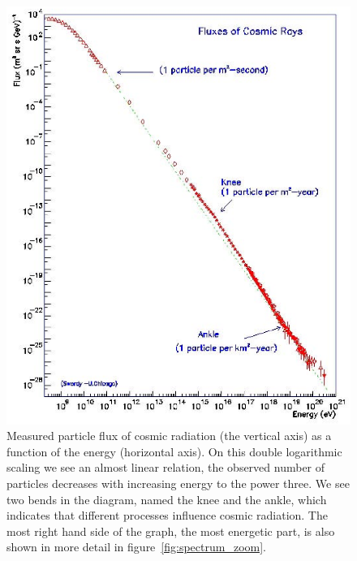 \documentclass[12pt,a4paper]{article}
\numberwithin{equation}{section}
\numberwithin{figure}{section}
\numberwithin{table}{section}
\begin{document}
\begin{figure}\begin{center}
\includegraphics[scale=0.8]{spectrum.eps}
\caption{Measured particle flux of cosmic radiation (the vertical axis) as a function of the energy (horizontal axis). On this double logarithmic scaling we see an almost linear relation, the observed number of particles decreases with increasing energy to the power three. We see two bends in the diagram, named the knee and the ankle, which indicates that different processes influence cosmic radiation. The most right hand side of the graph, the most energetic part, is also shown in more detail in figure~\ref{fig:spectrum_zoom}.}\label{fig:spectrum}
\end{center}\end{figure}
\end{document}

